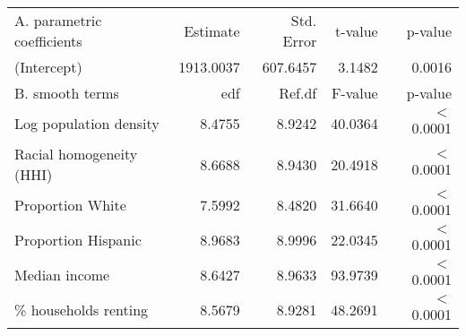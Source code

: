 \begin{table}[ht]
\centering
\begin{tabular}{lrrrr}
   \hline
A. parametric coefficients & Estimate & Std. Error & t-value & p-value \\ 
  (Intercept) & 1913.0037 & 607.6457 & 3.1482 & 0.0016 \\ 
   \hline
B. smooth terms & edf & Ref.df & F-value & p-value \\ 
  Log population density & 8.4755 & 8.9242 & 40.0364 & $<$ 0.0001 \\ 
  Racial homogeneity (HHI) & 8.6688 & 8.9430 & 20.4918 & $<$ 0.0001 \\ 
  Proportion White & 7.5992 & 8.4820 & 31.6640 & $<$ 0.0001 \\ 
  Proportion Hispanic & 8.9683 & 8.9996 & 22.0345 & $<$ 0.0001 \\ 
  Median income & 8.6427 & 8.9633 & 93.9739 & $<$ 0.0001 \\ 
  \% households renting & 8.5679 & 8.9281 & 48.2691 & $<$ 0.0001 \\ 
   \hline
\end{tabular}
\caption{ } 
\label{Demographic GAM}
\end{table}
